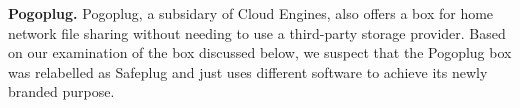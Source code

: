 {\bf Pogoplug.} Pogoplug, a subsidary of Cloud Engines, also offers a box for home network file sharing without needing to use a third-party storage provider.  Based on our examination of the box discussed below, we suspect that the Pogoplug box was relabelled as Safeplug and just uses different software to achieve its newly branded purpose.
